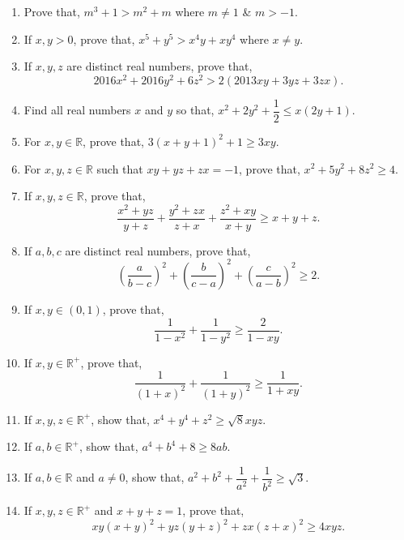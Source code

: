 \documentclass[11pt, a4paper]{article}
\begin{document}
\begin{enumerate}
\begin{enumerate}[(i)]
	\end{enumerate}
	
	\item Prove that, $m^3 + 1 > m^2 + m$ where $m \neq 1$ \& $m > -1$.
	
	\item If $x, y > 0$, prove that, $x^5 + y^5 > x^4y+xy^4$ where $x \neq y$.
	
	\item If $x, y, z$ are distinct real numbers, prove that, $$2016x^2 + 2016y^2 + 6z^2 > 2(2013xy + 3yz + 3zx).$$
	
	\item Find all real numbers $x$ and $y$ so that, $x^2 + 2y^2 + \dfrac{1}{2} \leq x(2y + 1)$.
	
	\item For $x, y \in \mathbb{R}$, prove that, $3(x + y + 1)^2 + 1 \geq 3xy$.
	
	\item For $x, y, z \in \mathbb{R}$ such that $xy + yz + zx = -1$, prove that, $x^2 + 5y^2 + 8z^2 \geq 4$.
	
	\item If $x, y, z \in \mathbb{R}$, prove that, $$\dfrac{x^2 + yz}{y + z} + \dfrac{y^2 + zx}{z + x} + \dfrac{z^2 + xy}{x + y} \geq x+y+z.$$
	
	\item If $a, b, c$ are distinct real numbers, prove that, $$\left( \dfrac{a}{b-c} \right)^2 + \left( \dfrac{b}{c-a} \right)^2 + \left( \dfrac{c}{a-b} \right)^2 \geq 2 .$$
	
	\item If $x, y \in (0, 1)$, prove that, $$\dfrac{1}{1-x^2} + \dfrac{1}{1-y^2} \geq \dfrac{2}{1-xy}.$$
	
	\item If $x, y \in \mathbb{R^+}$, prove that, $$\dfrac{1}{(1+x)^2} + \dfrac{1}{(1+y)^2} \geq \dfrac{1}{1+xy}.$$
	
	\item If $x, y, z \in \mathbb{R^+}$, show that, $x^4 + y^4 + z^2 \geq \sqrt{8}xyz$.
	
	\item If $a, b \in \mathbb{R^+}$, show that, $a^4 + b^4 + 8 \geq 8ab$.
	
	\item If $a, b \in \mathbb{R}$ and $a \neq 0$, show that, $a^2 + b^2 + \dfrac{1}{a^2} + \dfrac{1}{b^2} \geq \sqrt{3}$.
	
	\item If $x, y, z \in \mathbb{R^+}$ and $x+y+z = 1$, prove that, $$xy(x+y)^2 + yz(y+z)^2 + zx(z+x)^2 \geq 4xyz.$$
	

\end{enumerate}
\end{document}
